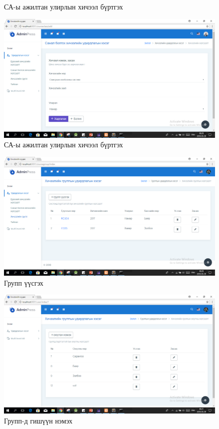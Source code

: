 \begin{center}
\begin{figure}[!h]
	\caption[СА-ы ажилтан улирлын хичээл бүртгэх]{СА-ы ажилтан улирлын хичээл бүртгэх}
	\label{text}
\end{figure}
\begin{figure}[!h]
	\includegraphics[scale=0.47]{Chart/screen-8}
	\caption[СА-ы ажилтан улирлын хичээл бүртгэх]{СА-ы ажилтан улирлын хичээл бүртгэх}
	\label{text}
\end{figure}
\begin{figure}[!h]
	\includegraphics[scale=0.47]{Chart/screen-9}
	\caption[Групп үүсгэх]{Групп үүсгэх}
	\label{text}
\end{figure}
\begin{figure}[!h]
	\includegraphics[scale=0.47]{Chart/screen-10}
	\caption[Групп-д гишүүн нэмэх]{Групп-д гишүүн нэмэх}
	\label{text}
\end{figure}
	

\end{center}

